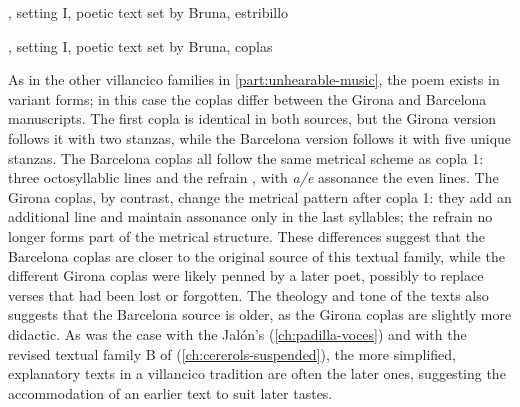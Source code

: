 {, setting I, poetic text set by Bruna,
estribillo}

{, setting I, poetic text set by Bruna, coplas}

As in the other villancico families in \cref{part:unhearable-music}, the poem
exists in variant forms; in this case the coplas differ between the Girona and
Barcelona manuscripts.
The first copla is identical in both sources, but the Girona version follows it
with two stanzas, while the Barcelona version follows it with five unique
stanzas.
The Barcelona coplas all follow the same metrical scheme as copla 1: three
octosyllablic lines and the refrain , with \emph{a/e} assonance
the even lines.
The Girona coplas, by contrast, change the metrical pattern after copla 1: they
add an additional line and maintain assonance only in the last syllables; the
 refrain no longer forms part of the metrical structure.
These differences suggest that the Barcelona coplas are closer to the original
source of this textual family, while the different Girona coplas were likely
penned by a later poet, possibly to replace verses that had been lost or
forgotten.
The theology and tone of the texts also suggests that the Barcelona source is
older, as the Girona coplas are slightly more didactic.
As was the case with the Jalón's 
(\cref{ch:padilla-voces}) and with the revised textual family B of
 (\cref{ch:cererols-suspended}), the more simplified,
explanatory texts in a villancico tradition are often the later ones,
suggesting the accommodation of an earlier text to suit later tastes.

